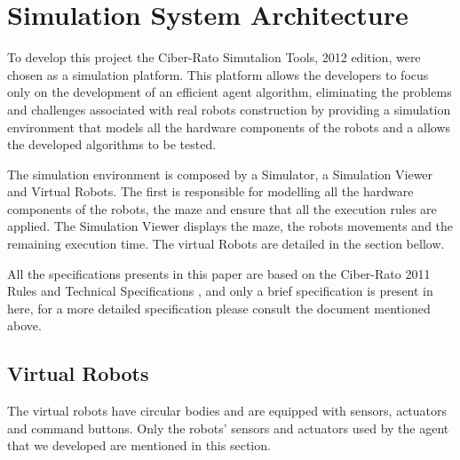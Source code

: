 \documentclass[oribibl]{llncs}
\begin{document}
\section{Simulation System Architecture}
To develop this project the Ciber-Rato Simutalion Tools, 2012 edition, were chosen as a simulation platform. This platform allows the developers to focus only on the development of an efficient agent algorithm, eliminating the problems and challenges associated with real robots construction by providing a simulation environment that models all the hardware components of the robots and a allows the developed algorithms to be tested\cite{Lau2002}. 

The simulation environment is composed by a Simulator, a Simulation Viewer and Virtual Robots. The first is responsible for modelling all the hardware components of the robots, the maze and ensure that all the execution rules are applied. The Simulation Viewer displays the maze, the robots movements and the remaining execution time. The virtual Robots are detailed in the section bellow.

All the specifications presents in this paper are based on the Ciber-Rato 2011 Rules and Technical Specifications \cite{DepartamentodeElectronica2011}, and only a brief specification is present in here, for a more detailed specification please consult the document mentioned above.

\subsection{Virtual Robots}
The virtual robots have circular bodies and are equipped with sensors, actuators and command buttons. Only the robots' sensors and actuators used by the agent that we developed are mentioned in this section.
\end{document}
